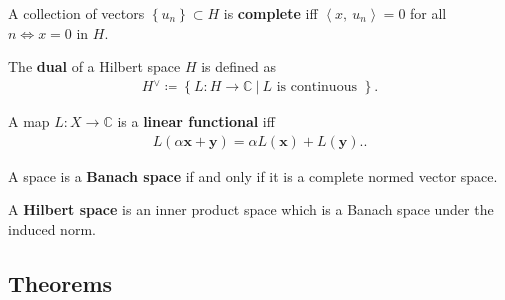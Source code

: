 \begin{definition}

A collection of vectors \(\left\{{u_{n}}\right\}\subset H\) is
\textbf{complete} iff \({\left\langle {x},~{u_{n}} \right\rangle} = 0\)
for all \(n \iff x = 0\) in \(H\).

\end{definition}

\begin{definition}

The \textbf{dual} of a Hilbert space \(H\) is defined as
\begin{align*}
H {}^{ \vee }\coloneqq\left\{{L: H\to {\mathbb{C}}{~\mathrel{\Big|}~}L \text{ is continuous }}\right\}
.\end{align*}

\end{definition}

\begin{definition}

A map \(L: X \to {\mathbb{C}}\) is a \textbf{linear functional} iff
\begin{align*}
L(\alpha\mathbf{x} + \mathbf{y}) = \alpha L(\mathbf{x}) + L(\mathbf{y}).
.\end{align*}

\end{definition}

\begin{definition}

A space is a \textbf{Banach space} if and only if it is a complete
normed vector space.

\end{definition}

\begin{definition}

A \textbf{Hilbert space} is an inner product space which is a Banach
space under the induced norm.

\end{definition}

\hypertarget{theorems}{%
\subsection{Theorems}\label{theorems}}

